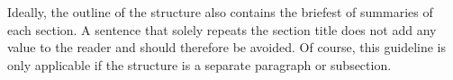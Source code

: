 


\noindent
Ideally, the outline of the structure also contains the briefest of summaries of each section.
A sentence that solely repeats the section title does not add any value to the reader and should therefore be avoided.
Of course, this guideline is only applicable if the structure is a separate paragraph or subsection.

